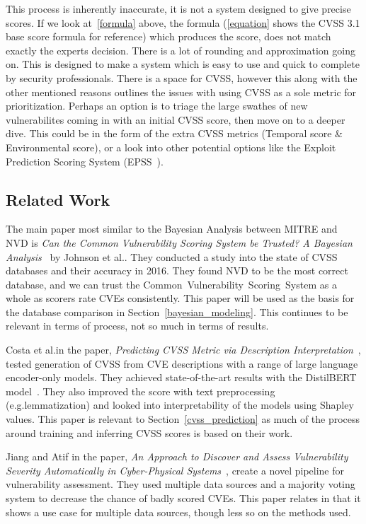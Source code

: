 \documentclass[12pt]{article}
\begin{document}
This process is inherently inaccurate, it is not a system designed to give precise scores. If we
look at~\ref{formula} above, the formula (\ref{equation} shows the CVSS 3.1 base score formula for
reference) which produces the score, does not match exactly the experts decision. There is a lot of
rounding and approximation going on. This is designed to make a system which is easy to use and
quick to complete by security professionals. There is a space for CVSS, however this along with the
other mentioned reasons outlines the issues with using CVSS as a sole metric for prioritization. Perhaps an option
is to triage the large swathes of new vulnerabilites coming in with an initial CVSS score, then move
on to a deeper dive. This could be in the form of the extra CVSS metrics (Temporal score \&
Environmental score), or a look into other potential options like the Exploit Prediction Scoring
System (EPSS~\cite{EPSS}).

\subsection{Related Work}

The main paper most similar to the Bayesian Analysis between MITRE and NVD is
\textit{Can the Common Vulnerability Scoring System be Trusted? A Bayesian
	Analysis}~\cite{bayes} by Johnson et al.\@. They conducted a study into the state of CVSS databases and their accuracy in 2016.
They found NVD to be the most correct database, and we can trust the Common~Vulnerability~Scoring~System as a
whole as scorers rate CVEs consistently. This paper will be used as the basis for the database
comparison in Section~\ref{bayesian_modeling}. This continues to be relevant in terms of process,
not so much in terms of results.

Costa et al.\@ in the paper, \textit{Predicting CVSS Metric via Description
	Interpretation}~\cite{costa}, tested generation of CVSS from CVE descriptions with a range of large
language encoder-only models. They achieved state-of-the-art results with the DistilBERT
model~\cite{distilbert}. They also improved the score with text preprocessing (e.g.\@ lemmatization)
and looked into interpretability of the models using Shapley values. This paper is relevant to
Section~\ref{cvss_prediction} as much of the process around training and inferring CVSS scores is
based on their work.

Jiang and Atif in the paper, \textit{An Approach to Discover and Assess
	Vulnerability Severity Automatically in Cyber-Physical Systems}~\cite{jiang}, create a novel
pipeline for vulnerability assessment. They used multiple data sources and a majority voting system
to decrease the chance of badly scored CVEs. This paper relates in that it shows a use case for
multiple data sources, though less so on the methods used.
\end{document}
